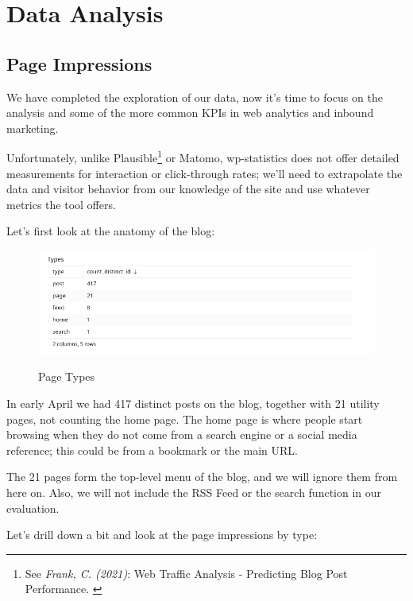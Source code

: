 %
%

\pagebreak
\section{Data Analysis}

\onehalfspacing

\subsection{Page Impressions}

We have completed the exploration of our data, now it's time to focus on the analysis and some of the more common KPIs in web analytics and inbound marketing.

Unfortunately, unlike Plausible\footnote{See \textit{Frank, C. (2021)}: Web Traffic Analysis - Predicting Blog Post Performance. \cite{previousBigData}} or Matomo, wp-statistics does not offer detailed measurements for interaction or click-through rates; we'll need to extrapolate the data and visitor behavior from our knowledge of the site and use whatever metrics the tool offers.

Let's first look at the anatomy of the blog:

\begin{figure}[H]
\centering
\caption {Page Types}
\includegraphics[width=\linewidth]{images/figure10.png}
\label{fig:pageTypes}
\end{figure}

In early April we had 417 distinct posts on the blog, together with 21 utility pages, not counting the home page. The home page is where people start browsing when they do not come from a search engine or a social media reference; this could be from a bookmark or the main URL. 

The 21 pages form the top-level menu of the blog, and we will ignore them from here on. Also, we will not include the RSS Feed or the search function in our evaluation.

Let's drill down a bit and look at the page impressions by type:

